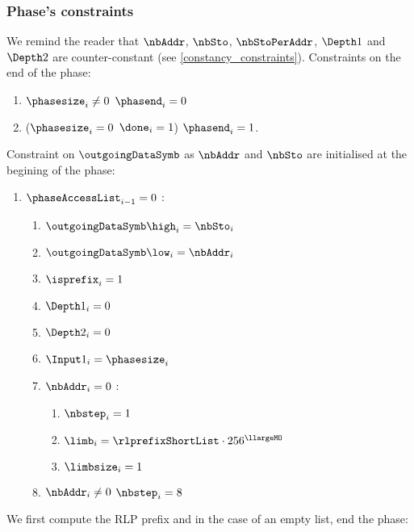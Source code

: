 \subsubsection{Phase's constraints}
We remind the reader that $\nbAddr$, $\nbSto$, $\nbStoPerAddr$, $\Depth1$ and $\Depth2$ are counter-constant (see \ref{constancy_constraints}).
\newline
Constraints on the end of the phase:
\begin{enumerate}
	\item \If $\phasesize_{i} \ne 0$ \Then $\phasend_{i}=0$
	\item\label{constraint: end of access set phase} \If ($\phasesize_{i}=0$ \et $\done_{i}=1$) \Then $\phasend_{i}=1$.
\end{enumerate}
Constraint on $\outgoingDataSymb$ as $\nbAddr$ and $\nbSto$ are initialised at the begining of the phase:
\begin{enumerate}[resume]
    \item \If $\phaseAccessList_{i-1}=0$ \Then:
    \begin{enumerate}
        \item $\outgoingDataSymb\high_{i}=\nbSto_{i}$
        \item $\outgoingDataSymb\low_{i}=\nbAddr_{i}$
		\item $\isprefix_{i}=1$
		\item $\Depth1_{i} = 0$
		\item $\Depth2_{i} = 0$
		\item $\Input1_{i} = \phasesize_{i}$
		\item \If $\nbAddr_{i}=0$ \Then: 
		\begin{enumerate}
			\item $\nbstep_{i}=1$
			\item $\limb_{i}=\rlprefixShortList \cdot 256 ^{\llargeMO}$
			\item $\limbsize_{i}=1$
		\end{enumerate}
		\item \If $\nbAddr_{i} \ne 0$ \Then $\nbstep_{i}=8$
    \end{enumerate} 
\end{enumerate}
We first compute the RLP prefix and in the case of an empty list, end the phase:
